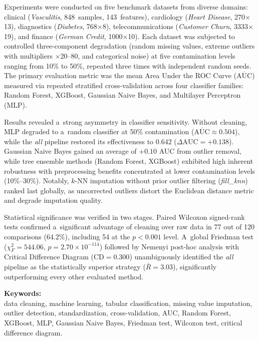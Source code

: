Experiments were conducted on five benchmark datasets from diverse domains: clinical (\textit{Vasculitis}, 848~samples, 143~features), cardiology (\textit{Heart Disease}, 270$\times$13), diagnostics (\textit{Diabetes}, 768$\times$8), telecommunications (\textit{Customer Churn}, 3333$\times$19), and finance (\textit{German Credit}, 1000$\times$10). Each dataset was subjected to controlled three-component degradation (random missing values, extreme outliers with multipliers $\times$20--80, and categorical noise) at five contamination levels ranging from 10\% to 50\%, repeated three times with independent random seeds. The primary evaluation metric was the mean Area Under the ROC Curve ($\overline{\mathrm{AUC}}$) measured via repeated stratified cross-validation across four classifier families: Random Forest, XGBoost, Gaussian Naive Bayes, and Multilayer Perceptron (MLP).

Results revealed a~strong asymmetry in classifier sensitivity. Without cleaning, MLP degraded to a~random classifier at 50\% contamination ($\overline{\mathrm{AUC}} \approx 0.504$), while the \textit{all} pipeline restored its effectiveness to $0.642$ ($\Delta\mathrm{AUC} = {+}0.138$). Gaussian Naive Bayes gained an average of $+0.10$ AUC from outlier removal, while tree ensemble methods (Random Forest, XGBoost) exhibited high inherent robustness with preprocessing benefits concentrated at lower contamination levels (10\%--30\%). Notably, $k$-NN imputation without prior outlier filtering (\textit{fill\_knn}) ranked last globally, as uncorrected outliers distort the Euclidean distance metric and degrade imputation quality.

Statistical significance was verified in two stages. Paired Wilcoxon signed-rank tests confirmed a~significant advantage of cleaning over raw data in 77 out of 120 comparisons (64.2\%), including 54 at the $p < 0.001$ level. A~global Friedman test ($\chi^2_F = 544.06$, $p = 2.70 \times 10^{-114}$) followed by Nemenyi post-hoc analysis with Critical Difference Diagram ($\mathrm{CD} = 0.300$) unambiguously identified the \textit{all} pipeline as the statistically superior strategy ($\bar{R} = 3.03$), significantly outperforming every other evaluated method.

\vspace{0.4cm}
\noindent \textbf{Keywords:}\\
data cleaning, machine learning, tabular classification, missing value imputation, outlier detection, standardization, cross-validation, AUC, Random Forest, XGBoost, MLP, Gaussian Naive Bayes, Friedman test, Wilcoxon test, critical difference diagram.
